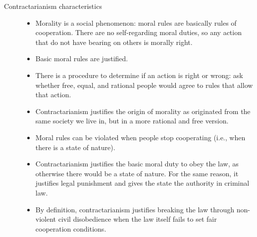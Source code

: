 \begin{description}
    \item[Contractarianism characteristics] \phantom{} 
        \begin{itemize}
            \item Morality is a social phenomenon: moral rules are basically rules of cooperation. There are no self-regarding moral duties, so any action that do not have bearing on others is morally right.
            \item Basic moral rules are justified.
            \item There is a procedure to determine if an action is right or wrong: ask whether free, equal, and rational people would agree to rules that allow that action.
            \item Contractarianism justifies the origin of morality as originated from the same society we live in, but in a more rational and free version.
            \item Moral rules can be violated when people stop cooperating (i.e., when there is a state of nature).
            \item Contractarianism justifies the basic moral duty to obey the law, as otherwise there would be a state of nature. For the same reason, it justifies legal punishment and gives the state the authority in criminal law.
            \item By definition, contractarianism justifies breaking the law through non-violent civil disobedience when the law itself fails to set fair cooperation conditions.
        \end{itemize}
\end{description}


